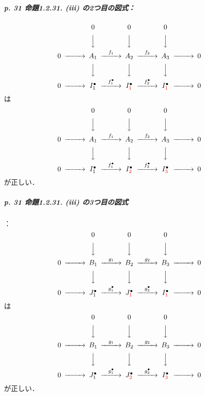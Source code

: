 \subparagraph{p. 31 命題1.2.31. (iii) の2つ目の図式：}
    \[\begin{CD}
        &&0&&0&&0\\
        &&@VVV@VVV@VVV\\
    0@>>>A_1@>{f_1}>>A_2@>{f_2}>>A_3@>>>0\\
    &&@VVV@VVV@VVV\\
    0@>>>I^\bullet_1@>{f^\bullet_1}>>I^\bullet_{\textcolor{red}{1}}@>{f^\bullet_2}>>I^\bullet_{\textcolor{red}{1}}@>>>0
    \end{CD}
    \]
は
  \[
    \begin{CD}
        &&0&&0&&0\\
        &&@VVV@VVV@VVV\\
    0@>>>A_1@>{f_1}>>A_2@>{f_2}>>A_3@>>>0\\
    &&@VVV@VVV@VVV\\
    0@>>>I^\bullet_1@>{f^\bullet_1}>>I^\bullet_{\textcolor{red}{2}}@>{f^\bullet_2}>>I^\bullet_{\textcolor{red}{3}}@>>>0
    \end{CD}
    \]
が正しい．

\subparagraph{p. 31 命題1.2.31. (iii) の3つ目の図式}：
    \[\begin{CD}
        &&0&&0&&0\\
        &&@VVV@VVV@VVV\\
    0@>>>B_1@>{g_1}>>B_2@>{g_2}>>B_3@>>>0\\
    &&@VVV@VVV@VVV\\
    0@>>>J^\bullet_1@>{g^\bullet_1}>>J^\bullet_{\textcolor{red}{1}}@>{g^\bullet_2}>>I^\bullet_{\textcolor{red}{1}}@>>>0
    \end{CD}\]
は  \[
    \begin{CD}
        &&0&&0&&0\\
        &&@VVV@VVV@VVV\\
    0@>>>B_1@>{g_1}>>B_2@>{g_2}>>B_3@>>>0\\
    &&@VVV@VVV@VVV\\
    0@>>>J^\bullet_1@>{g^\bullet_1}>>J^\bullet_{\textcolor{red}{2}}@>{g^\bullet_2}>>I^\bullet_{\textcolor{red}{3}}@>>>0
    \end{CD}
    \]
が正しい．


